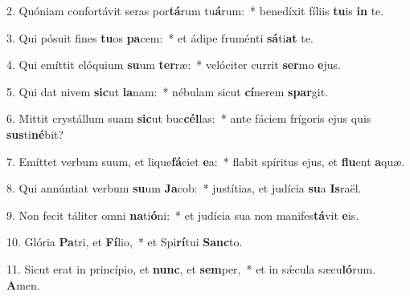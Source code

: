 2. Quóniam confortávit seras por\textbf{tá}rum tu\textbf{á}rum:~*  benedíxit fíliis \textbf{tu}is \textbf{in} te.\

3. Qui pósuit fines \textbf{tu}os \textbf{pa}cem:~*  et ádipe fruménti \textbf{sá}ti\textbf{at} te.\

4. Qui emíttit elóquium \textbf{su}um \textbf{ter}ræ:~*  velóciter currit \textbf{ser}mo \textbf{e}jus.\

5. Qui dat nivem \textbf{sic}ut \textbf{la}nam:~*  nébulam sicut \textbf{cí}nerem \textbf{spar}git.\

6. Mittit crystállum suam \textbf{sic}ut buc\textbf{cél}las:~*  ante fáciem frígoris ejus quis \textbf{sus}ti\textbf{né}bit?\

7. Emíttet verbum suum, et lique\textbf{fá}ciet \textbf{e}a:~*  flabit spíritus ejus, et \textbf{flu}ent \textbf{a}quæ.\

8. Qui annúntiat verbum \textbf{su}um \textbf{Ja}cob:~*  justítias, et judícia \textbf{su}a \textbf{Is}raël.\

9. Non fecit táliter omni \textbf{na}ti\textbf{ó}ni:~*  et judícia sua non manifes\textbf{tá}vit \textbf{e}is.\

10. Glória \textbf{Pa}tri, et \textbf{Fí}lio,~*  et Spi\textbf{rí}tui \textbf{Sanc}to.\

11. Sicut erat in princípio, et \textbf{nunc}, et \textbf{sem}per,~*  et in sǽcula sæcu\textbf{ló}rum. \textbf{A}men.\


